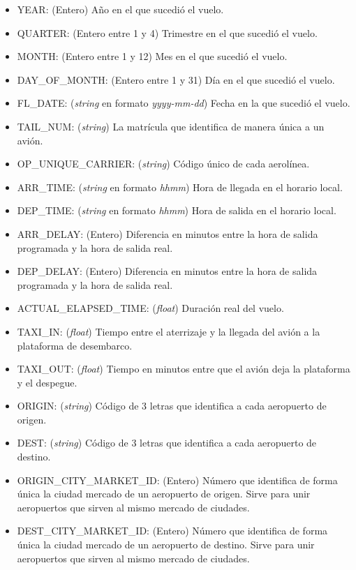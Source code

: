\begin{itemize}
	\item YEAR: (Entero) Año en el que sucedió el vuelo.
	\item QUARTER: (Entero entre 1 y 4) Trimestre en el que sucedió el vuelo.
	\item MONTH: (Entero entre 1 y 12) Mes en el que sucedió el vuelo.
	\item DAY\_OF\_MONTH: (Entero entre 1 y 31) Día en el que sucedió el vuelo.
	\item FL\_DATE: (\textit{string} en formato \textit{yyyy-mm-dd}) Fecha en la que sucedió el vuelo.
	\item TAIL\_NUM: (\textit{string}) La matrícula que identifica de manera única a un avión.
	\item OP\_UNIQUE\_CARRIER: (\textit{string}) Código único de cada aerolínea.
	\item ARR\_TIME: (\textit{string} en formato \textit{hhmm}) Hora de llegada en el horario local.
	\item DEP\_TIME: (\textit{string} en formato \textit{hhmm}) Hora de salida en el horario local.
	\item ARR\_DELAY: (Entero) Diferencia en minutos entre la hora de salida programada y la hora de salida real.
	\item DEP\_DELAY: (Entero) Diferencia en minutos entre la hora de salida programada y la hora de salida real.
	\item ACTUAL\_ELAPSED\_TIME: (\textit{float}) Duración real del vuelo.
	\item TAXI\_IN: (\textit{float}) Tiempo entre el aterrizaje y la llegada del avión a la plataforma de desembarco.
	\item TAXI\_OUT: (\textit{float}) Tiempo en minutos entre que el avión deja la plataforma y el despegue.
	\item ORIGIN: (\textit{string}) Código de 3 letras que identifica a cada aeropuerto de origen.
	\item DEST: (\textit{string}) Código de 3 letras que identifica a cada aeropuerto de destino.
	\item ORIGIN\_CITY\_MARKET\_ID: (Entero) Número que identifica de forma única la ciudad mercado de un aeropuerto de origen. Sirve para unir aeropuertos que sirven al mismo mercado de ciudades.
	\item DEST\_CITY\_MARKET\_ID: (Entero) Número que identifica de forma única la ciudad mercado de un aeropuerto de destino. Sirve para unir aeropuertos que sirven al mismo mercado de ciudades.
\end{itemize}

